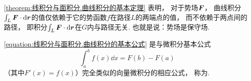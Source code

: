 \cref{theorem:线积分与面积分.曲线积分的基本定理} 表明，
对于势场\(\boldsymbol{F}\)，
曲线积分\(\int_L \boldsymbol{F}\cdot\dd{\boldsymbol{r}}\)的值仅依赖于它的势函数\(f\)在路径\(L\)的两端点的值，
而不依赖于两点间的路径，
即积分\(\int_L \boldsymbol{F}\cdot\dd{\boldsymbol{r}}\)在\(G\)内与路径无关.
也就是说：势场是保守场.

\cref{equation:线积分与面积分.曲线积分的基本公式}
是与微积分基本公式\[
	\int_a^b f(x) \dd{x}
	= F(b) - F(a)
\]
（其中\(F'(x) = f(x)\)）完全类似的向量微积分的相应公式，
称为.
